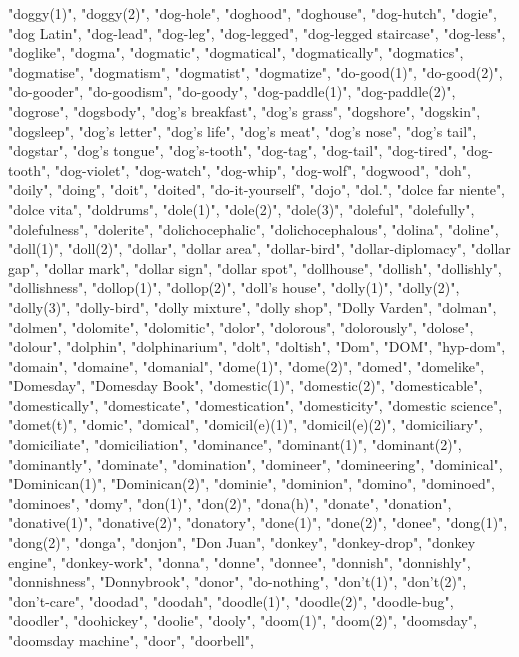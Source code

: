 "doggy(1)",
"doggy(2)",
"dog-hole",
"doghood",
"doghouse",
"dog-hutch",
"dogie",
"dog Latin",
"dog-lead",
"dog-leg",
"dog-legged",
"dog-legged staircase",
"dog-less",
"doglike",
"dogma",
"dogmatic",
"dogmatical",
"dogmatically",
"dogmatics",
"dogmatise",
"dogmatism",
"dogmatist",
"dogmatize",
"do-good(1)",
"do-good(2)",
"do-gooder",
"do-goodism",
"do-goody",
"dog-paddle(1)",
"dog-paddle(2)",
"dogrose",
"dogsbody",
"dog's breakfast",
"dog's grass",
"dogshore",
"dogskin",
"dogsleep",
"dog's letter",
"dog's life",
"dog's meat",
"dog's nose",
"dog's tail",
"dogstar",
"dog's tongue",
"dog's-tooth",
"dog-tag",
"dog-tail",
"dog-tired",
"dog-tooth",
"dog-violet",
"dog-watch",
"dog-whip",
"dog-wolf",
"dogwood",
"doh",
"doily",
"doing",
"doit",
"doited",
"do-it-yourself",
"dojo",
"dol.",
"dolce far niente",
"dolce vita",
"doldrums",
"dole(1)",
"dole(2)",
"dole(3)",
"doleful",
"dolefully",
"dolefulness",
"dolerite",
"dolichocephalic",
"dolichocephalous",
"dolina",
"doline",
"doll(1)",
"doll(2)",
"dollar",
"dollar area",
"dollar-bird",
"dollar-diplomacy",
"dollar gap",
"dollar mark",
"dollar sign",
"dollar spot",
"dollhouse",
"dollish",
"dollishly",
"dollishness",
"dollop(1)",
"dollop(2)",
"doll's house",
"dolly(1)",
"dolly(2)",
"dolly(3)",
"dolly-bird",
"dolly mixture",
"dolly shop",
"Dolly Varden",
"dolman",
"dolmen",
"dolomite",
"dolomitic",
"dolor",
"dolorous",
"dolorously",
"dolose",
"dolour",
"dolphin",
"dolphinarium",
"dolt",
"doltish",
"Dom",
"DOM",
"hyp-dom",
"domain",
"domaine",
"domanial",
"dome(1)",
"dome(2)",
"domed",
"domelike",
"Domesday",
"Domesday Book",
"domestic(1)",
"domestic(2)",
"domesticable",
"domestically",
"domesticate",
"domestication",
"domesticity",
"domestic science",
"domet(t)",
"domic",
"domical",
"domicil(e)(1)",
"domicil(e)(2)",
"domiciliary",
"domiciliate",
"domiciliation",
"dominance",
"dominant(1)",
"dominant(2)",
"dominantly",
"dominate",
"domination",
"domineer",
"domineering",
"dominical",
"Dominican(1)",
"Dominican(2)",
"dominie",
"dominion",
"domino",
"dominoed",
"dominoes",
"domy",
"don(1)",
"don(2)",
"dona(h)",
"donate",
"donation",
"donative(1)",
"donative(2)",
"donatory",
"done(1)",
"done(2)",
"donee",
"dong(1)",
"dong(2)",
"donga",
"donjon",
"Don Juan",
"donkey",
"donkey-drop",
"donkey engine",
"donkey-work",
"donna",
"donne",
"donnee",
"donnish",
"donnishly",
"donnishness",
"Donnybrook",
"donor",
"do-nothing",
"don't(1)",
"don't(2)",
"don't-care",
"doodad",
"doodah",
"doodle(1)",
"doodle(2)",
"doodle-bug",
"doodler",
"doohickey",
"doolie",
"dooly",
"doom(1)",
"doom(2)",
"doomsday",
"doomsday machine",
"door",
"doorbell",
